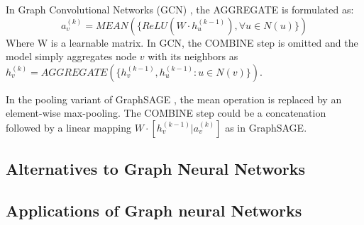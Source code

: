 In Graph Convolutional Networks (GCN) \cite{gcn}, the AGGREGATE is formulated as:
$$a_v^{(k)} = MEAN(\{ ReLU(W \cdot h_u^{(k-1)}), \forall u \in N(u) \}) $$
Where W is a learnable matrix. In GCN, the COMBINE step is omitted and the model simply aggregates node $v$ with its neighbors as $h_v^{(k)} = AGGREGATE(\{ h_v^{(k-1)}, h_u^{(k-1)}: u \in N(v) \})$.

In the pooling variant of GraphSAGE \cite{graphsage}, the mean operation is replaced by an element-wise max-pooling. The COMBINE step could be a concatenation followed by a linear mapping $W \cdot [h_v^{(k-1)} | a_v^{(k)}]$ as in GraphSAGE.












\subsection{Alternatives to Graph Neural Networks}








\subsection{Applications of Graph neural Networks}


